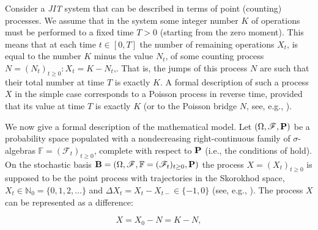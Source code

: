 


\smallskip





	Consider a \emph{JIT} system that can be described in terms of point (counting) processes. We assume that in the system some integer number $K$ of operations must be performed to a fixed time $T > 0$ (starting from the zero moment). This means that at each time $t \in [0, T]$ the number of remaining operations $X_t$, is equal to the number $K$ minus the value $N_t$, of some counting process $N = (N_t)_{t \geq 0}: X_t = K - N_t$,. That is, the jumps of this process $N$ are such that their total number at time $T$ is exactly $K$. A formal description of such a process $X$ in the simple case corresponds to a Poisson process in reverse time, provided that its value at time $T$ is exactly $K$ (or to the Poisson bridge $N$, see, e.g., \cite{jacod, privault, conforti}).

	

	We now give a formal description of the mathematical model. Let $(\Omega, {\mathscr{F}}, \textbf P)$ be a probability space populated with a nondecreasing right-continuous family of $\sigma$-algebras ${\mathbb{F}}=({\mathscr{F}}_t)_{t\geq 0}$, complete with respect to $\textbf P$ (i.e., the conditions of \cite{dellacherie} hold). On the stochastic basis  ${\textbf B}= (\Omega, {\mathscr{F}}, {\mathbb{F}}=({\mathscr{F}}_t)_{t\geq 0}, \textbf P)$ the process $X = (X_t)_{t \geq 0}$ is supposed to be the point process with trajectories in the Skorokhod space, ${X_t}\in{\mathbb{N}}_0 =\{0, 1, 2, …\}$ and ${\Delta}X_t = X_t -X_{t-} \in \{-1, 0\}$ (see, e.g., \cite{butov1991, butov1994a,  butov1994b}). The process $X$ can be represented as a difference: 

\begin{equation}\label{eq:X}

	X = {X_0}-N = K - N,

\end{equation}

